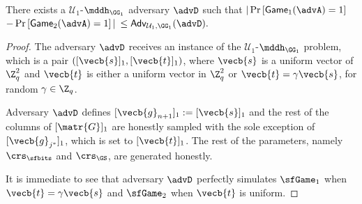\begin{lemma} There exists a $\mathcal{U}_1$-$\mddh_{\GG_1}$ adversary $\advD$ such that
$|\Pr\left[\mathsf{Game}_{1}(\advA)=1\right]$ $-\Pr\left[\mathsf{Game}_{2}(\advA)=1\right]|$ $\leq
    \mathsf{Adv}_{\mathcal{U}_1,\GG_1}(\advD).$
\end{lemma}
\begin{proof}
The adversary $\advD$ receives an instance of the $\mathcal{U}_1$-$\mddh_{\GG_1}$ problem, which is a pair
$([\vecb{s}]_1, [\vecb{t}]_1)$, where $\vecb{s}$ is a uniform vector 
of $\Z_q^2$ and $\vecb{t}$ is either a uniform vector in $\Z_q^2$ or 
$\vecb{t}=\gamma\vecb{s}$, for random $\gamma\in\Z_q$.
 
Adversary $\advD$ defines
$[\vecb{g}_{n+1}]_1:= [\vecb{s}]_1$ and the rest of the columns of $[\matr{G}]_1$ are honestly sampled
with the sole exception of $[\vecb{g}_{j^*}]_1$, which is set to $[\vecb{t}]_1$.
The rest of the parameters, namely $\crs_\sfbits$ and $\crs_\GS$, are generated honestly.

It is immediate to see that adversary $\advD$ perfectly simulates $\sfGame_1$ when $\vecb{t}=\gamma\vecb{s}$ and $\sfGame_2$ when $\vecb{t}$ is uniform.  
\end{proof}

% 
%

